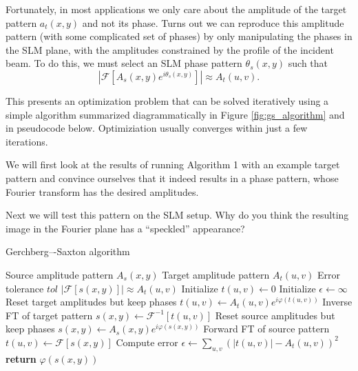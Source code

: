 \documentclass[a4paper]{report}
\newcommand{\nexercise}[0]{\arabic{exercises}\addtocounter{exercises}{1}}
\begin{document}
Fortunately, in most applications we only care about the amplitude of the target pattern $a_t(x,y)$ and not its phase. Turns out we can reproduce this amplitude pattern (with some complicated set of phases) by only manipulating the phases in the SLM plane, with the amplitudes constrained by the profile of the incident beam. To do this, we must select an SLM phase pattern $\theta_s(x,y)$ such that
\begin{equation}
\left|\mathscr{F}\left[A_s(x,y)e^{i \theta_s(x,y)}\right]\right| \approx A_t(u,v).
\end{equation}

This presents an optimization problem that can be solved iteratively using a simple algorithm summarized diagrammatically in Figure \ref{fig:gs_algorithm} and in pseudocode below. Optimiziation usually converges within just a few iterations.

\begin{exercisebox}[frametitle={Exercise \nexercise}: Generating holograms]
We will first look at the results of running Algorithm 1 with an example target pattern and convince ourselves that it indeed results in a phase pattern, whose Fourier transform has the desired amplitudes.

Next we will test this pattern on the SLM setup. Why do you think the resulting image in the Fourier plane has a ``speckled'' appearance?
\end{exercisebox}

\begin{algorithm}
\caption{Gerchberg–-Saxton algorithm} 
\label{alg1} 
\begin{algorithmic}[1]
    \Require Source amplitude pattern $A_s(x,y)$
    \Require Target amplitude pattern $A_t(u,v)$
    \Require Error tolerance $tol$
    \Ensure $|\mathscr{F}[s(x,y)]| \approx A_t(u,v)$
    \State Initialize $t(u,v) \leftarrow 0$
    \State Initialize $\epsilon \leftarrow \infty$
    	\State Reset target amplitudes but keep phases $t(u,v) \leftarrow A_t(u,v) e^{i \varphi(t(u,v))}$
    	\State Inverse FT of target pattern $s(x,y) \leftarrow \mathscr{F}^{-1}[t(u,v)]$
   		\State Reset source amplitudes but keep phases $s(x,y) \leftarrow A_s(x,y)e^{i \varphi(s(x,y))}$
   		\State Forward FT of source pattern $t(u,v) \leftarrow \mathscr{F}[s(x,y)]$
    	\State Compute error $\epsilon \leftarrow \sum_{u,v} (|t(u,v)| - A_t(u,v))^2$ 
    \EndWhile
    \State \textbf{return} $\varphi(s(x,y))$
    \end{algorithmic}
\end{algorithm}
\end{document}

